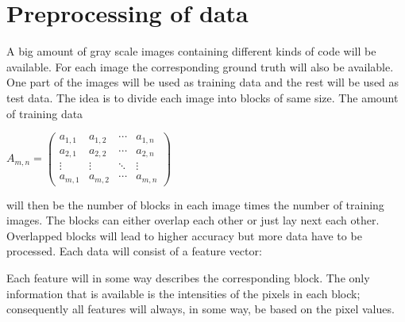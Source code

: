 \chapter{Preprocessing of data}
\label{sec:Preprocessing of data}

A big amount of gray scale images containing different kinds of code will be available. For each image the corresponding ground truth will also be available. One part of the images will be used as training data and the rest will be used as test data. The idea is to divide each image into blocks of same size. The amount of training data
\begin{center}

\begin{math}
A_{m,n} =
 \begin{pmatrix}
  a_{1,1} & a_{1,2} & \cdots & a_{1,n} \\
  a_{2,1} & a_{2,2} & \cdots & a_{2,n} \\
  \vdots  & \vdots  & \ddots & \vdots  \\
  a_{m,1} & a_{m,2} & \cdots & a_{m,n}
 \end{pmatrix}
\end{math}
\end{center}
will then be the number of blocks in each image times the number of training images. The blocks can either overlap each other or just lay next each other. Overlapped blocks will lead to higher accuracy but more data have to be processed. Each data will consist of a feature vector:

Each feature will in some way describes the corresponding block. The only information that is available is the intensities of the pixels in each block; consequently all features will always, in some way, be based on the pixel values.


